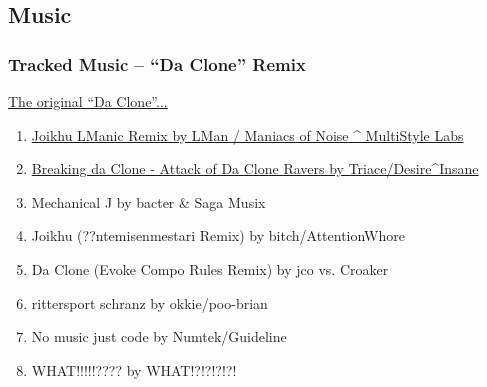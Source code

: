 \documentclass{beamer}
\begin{document}
\subsection{Music}
\begin{frame}
  \frametitle{Tracked Music -- ``Da Clone'' Remix}
  \href{https://www.youtube.com/watch?v=WnQ6012AwmA}{The original ``Da Clone''...}
  \begin{enumerate}
  \item \href{https://demozoo.org/music/191899/}{Joikhu LManic Remix by LMan / Maniacs of Noise \^{} MultiStyle Labs}
  \item \href{https://files.scene.org/view/parties/2018/evoke18/tracked_music_-_da_clone_remix/triace_-_breaking_da_clone_-_attack_of_da_clone_ravers.zip}{Breaking da Clone - Attack of Da Clone Ravers by Triace/Desire\^{}Insane}
  \item Mechanical J by bacter \& Saga Musix
  \item Joikhu (??ntemisenmestari Remix) by bitch/AttentionWhore
  \item Da Clone (Evoke Compo Rules Remix) by jco vs. Croaker
  \item rittersport schranz by okkie/poo-brian
  \item No music just code by Numtek/Guideline
  \item WHAT!!!!!???? by WHAT!?!?!?!?!
  \end{enumerate}
\end{frame}
\end{document}
